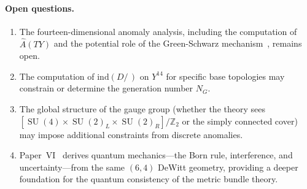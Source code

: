 \documentclass[12pt,a4paper]{article}
\theoremstyle{definition}
\newcommand{\SU}{\operatorname{SU}}
\newcommand{\Z}{\mathbb{Z}}
\begin{document}
\paragraph{Open questions.}
\begin{enumerate}
\item The fourteen-dimensional anomaly analysis, including the computation of $\hat{A}(TY)$ and the potential role of the Green-Schwarz mechanism~\cite{GreenSchwarz1984}, remains open.
\item The computation of $\mathrm{ind}(D\!\!\!\!/\,)$ on $Y^{14}$ for specific base topologies may constrain or determine the generation number $N_G$.
\item The global structure of the gauge group (whether the theory sees $[\SU(4) \times \SU(2)_L \times \SU(2)_R]/\Z_2$ or the simply connected cover) may impose additional constraints from discrete anomalies.
\item Paper~VI~\cite{Paper6} derives quantum mechanics---the Born rule, interference, and uncertainty---from the same $(6,4)$ DeWitt geometry, providing a deeper foundation for the quantum consistency of the metric bundle theory.
\end{enumerate}




\end{document}

